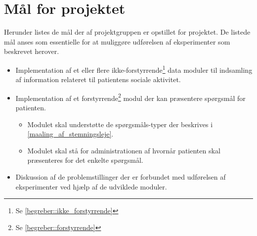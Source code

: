 \section{Mål for projektet}\label{problem:maal}
Herunder listes de mål der af projektgruppen er opstillet for projektet.
De listede mål anses som essentielle for at muliggøre udførelsen af eksperimenter som beskrevet herover.
\begin{itemize}
\item Implementation af et eller flere ikke-forstyrrende\footnote{Se \cref{begreber::ikke_forstyrrende}} data moduler til indsamling af information relateret til patientens sociale aktivitet.
\item Implementation af et forstyrrende\footnote{Se \cref{begreber::forstyrrende}} modul der kan præsentere spørgsmål for patienten.
\begin{itemize}
\item Modulet skal understøtte de spørgsmåls-typer der beskrives i \cref{maaling_af_stemningsleje}.
\item Modulet skal stå for administrationen af hvornår patienten skal præsenteres for det enkelte spørgsmål.
\end{itemize}
\item Diskussion af de problemstillinger der er forbundet med udførelsen af eksperimenter ved hjælp af de udviklede moduler.
\end{itemize}